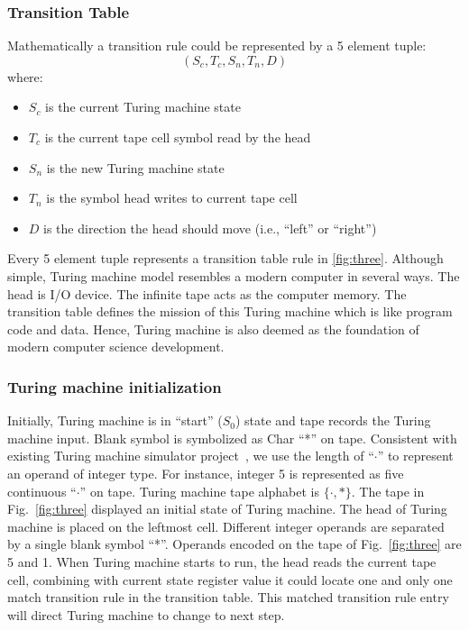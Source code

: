 \documentclass[lnicst]{svmultln}
\newcommand{\F}{Fig.}
\begin{document}
\subsubsection{Transition Table}
Mathematically a transition rule could be represented by a 5 element
tuple:\[(S_c, T_c, S_n, T_n, D)\] where:

\begin{itemize}
  \item \(S_c\) is the current Turing machine state
  \item \(T_c\) is the current tape cell symbol read by the head
  \item \(S_n\) is the new Turing machine state
  \item \(T_n\) is the symbol head writes to current tape cell
  \item \(D\) is the direction the head should move (i.e., ``left'' or
    ``right'')
\end{itemize}

Every 5 element tuple represents a transition table rule in \ref{fig:three}.
Although simple, Turing machine model resembles a modern computer in several ways. 
The head is I/O device. The infinite tape acts as the computer memory.
The transition table defines the mission of this Turing machine which is like program
code and data. Hence, Turing machine is also deemed as
the foundation of modern computer science development.


\subsubsection{Turing machine initialization}

Initially, Turing machine is in ``start'' (\(S_0\)) state and tape records the
Turing machine input. Blank symbol is symbolized as Char ``*'' on tape.
Consistent with existing Turing machine simulator project~\cite{SingleTape}, we
use the length of ``$\cdot$'' to represent an operand of integer type. For
instance, integer 5 is represented as five continuous ``$\cdot$'' on tape.
Turing machine tape alphabet is $\{\cdot,* \}$. The tape in \F~\ref{fig:three}
displayed an initial state of Turing machine. The head of Turing machine is
placed on the leftmost cell. Different integer operands are separated by a
single blank symbol ``*''. Operands encoded on the tape of
  \F~\ref{fig:three} are 5 and 1. When Turing machine starts to run, the head
reads the current tape cell, combining with current state register value it
could locate one and only one match transition rule in the transition table. This matched 
transition rule entry will direct Turing machine to change to next step.
\end{document}
